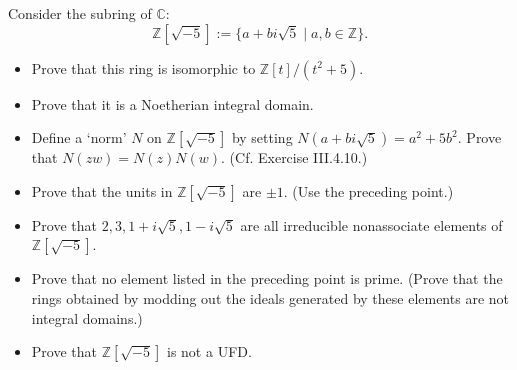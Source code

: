 \documentclass[../../master.tex]{subfiles}
\begin{document}
    \begin{problem}
        Consider the subring of $\mathbb{C}$:
        \[
            \mathbb{Z}[\sqrt{-5}] := \{a + bi \sqrt{5} \mid a, b \in
            \mathbb{Z}\}.
        \] 
        \begin{itemize}
            \item Prove that this ring is isomorphic to $\mathbb{Z}[t] / (t^2+5)$.
            \item Prove that it is a Noetherian integral domain.
            \item Define a `norm' $N$ on $\mathbb{Z}[\sqrt{-5}]$ by setting $N(a +
                bi \sqrt{5}) = a^2 + 5b^2$. Prove that $N(zw) = N(z) N(w)$. (Cf.
                Exercise III.4.10.)
            \item Prove that the units in $\mathbb{Z}[\sqrt{-5}]$ are $\pm 1$. (Use
                the preceding point.)
            \item Prove that $2, 3, 1 + i \sqrt{5}, 1 - i \sqrt{5}$ are all
                irreducible nonassociate elements of $\mathbb{Z}[\sqrt{-5}]$.
            \item Prove that no element listed in the preceding point is prime.
                (Prove that the rings obtained by modding out the ideals generated
                by these elements are not integral domains.)
            \item Prove that $\mathbb{Z}[\sqrt{-5}]$ is not a UFD.
        \end{itemize}
    \end{problem}
\end{document}

